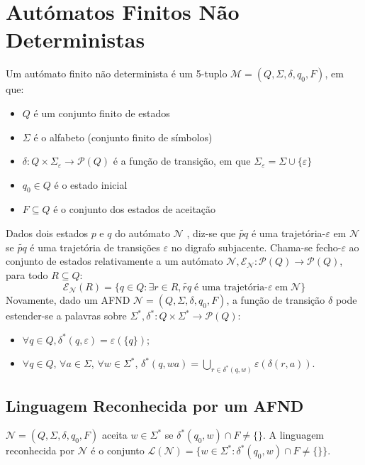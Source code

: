 \documentclass[10pt,a4paper]{report}
\begin{document}
\section{Autómatos Finitos Não Deterministas}
Um autómato finito não determinista é um 5-tuplo $\mathcal{M} = (Q,\Sigma,\delta,q_0,F)$, em que:
\begin{itemize}
\item $Q$ é um conjunto finito de estados
\item $\Sigma$ é o alfabeto (conjunto finito de símbolos)
\item $\delta: Q \times \Sigma_\varepsilon \rightarrow \mathcal{P}(Q)$ é a função de transição, em que $\Sigma_\varepsilon = \Sigma \cup \{\varepsilon\}$
\item $q_0 \in Q$ é o estado inicial
\item $F \subseteq Q$ é o conjunto dos estados de aceitação
\end{itemize}
Dados dois estados $p$ e $q$ do autómato $\mathcal{N}$ , diz-se que $\widetilde{pq}$ é
uma trajetória-$\varepsilon$ em $\mathcal{N}$ se $\widetilde{pq}$ é uma trajetória de transições $\varepsilon$ no digrafo subjacente. Chama-se fecho-$\varepsilon$ ao conjunto de estados relativamente a um autómato $\mathcal{N}, \mathcal{E_N}: \mathcal{P}(Q) \rightarrow \mathcal{P}(Q)$, para todo $R \subseteq Q$:
$$
\mathcal{E_N} (R) = \{q \in Q: \exists r \in R, \widetilde{rq} \; \text{é uma trajetória-}\varepsilon \; \text{em} \; \mathcal{N}\}
$$
Novamente, dado um AFND $\mathcal{N} = (Q,\Sigma,\delta,q_0,F)$, a função de transição $\delta$ pode estender-se a palavras sobre $\Sigma^*, \delta^*: Q \times \Sigma^* \rightarrow \mathcal{P}(Q)$:
\begin{itemize}
\item $\forall q \in Q, \delta^*(q, \varepsilon) = \varepsilon(\{q\})$;
\item $\forall q \in Q$, $\forall a \in \Sigma$, $\forall w \in \Sigma^*$, $\delta^*(q,wa) = \bigcup_{r \in \delta^*(q,w)}\varepsilon(\delta(r,a))$.
\end{itemize}
\subsection{Linguagem Reconhecida por um AFND}
$\mathcal{N} = (Q,\Sigma,\delta,q_0,F)$ aceita $w \in \Sigma^*$ se $\delta^*(q_0,w) \cap F \neq \{\}$. A linguagem reconhecida por $\mathcal{N}$ é o conjunto $\mathcal{L(N)} = \{w \in \Sigma^*: \delta^*(q_0,w) \cap F \neq \{\}\}$.
\end{document}

